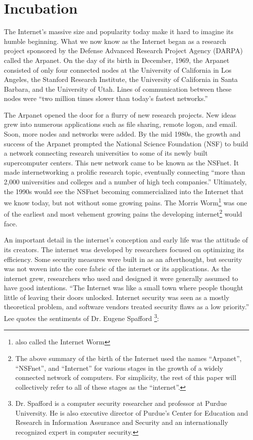 \section*{Incubation}
\setcounter{page}{1}

The Internet's massive size and popularity today make it hard to imagine its
humble beginning. What we now know as the Internet began as a research project
sponsored by the Defense Advanced Research Project Agency (DARPA) called the
Arpanet. On the day of its birth in December, 1969, the Arpanet consisted of
only four connected nodes at the University of California in Los Angeles, the
Stanford Research Institute, the University of California in Santa Barbara, and
the University of Utah.
Lines of communication between these nodes were ``two million times slower than
today's fastest networks.''\cite{strawn_masterminds_2014} 

The Arpanet opened the door for a flurry of new research projects. New ideas
grew into numerous applications such as file sharing, remote logon, and email.
Soon, more nodes and networks were added. By the mid 1980s, the growth and success
of the Arpanet prompted the National Science Foundation (NSF) to build a network
connecting research universities to some of its newly built supercomputer
centers.
This new network came to be known as the NSFnet.
It made internetworking a prolific research topic,
eventually connecting ``more than 2,000 universities and colleges and a
number of high tech companies.''\cite{strawn_masterminds_2014} Ultimately, the
1990s would see the NSFnet becoming commercialized into the Internet that we
know today, but not without some growing pains. The Morris
Worm\footnote{also called the Internet Worm} was one of the earliest and most
vehement growing pains the developing internet\footnote {
The above summary of the
birth of the Internet used the names ``Arpanet'', ``NSFnet'', and ``Internet''
for various stages in the growth of a widely connected network of computers. For
simplicity, the rest of this paper will collectively refer to all of these
stages as the ``internet''.
} 
would face.

An important detail in the internet's conception and early life was the
attitude of its creators.
The internet was developed by researchers focused on
optimizing its efficiency. Some security
measures were built in as an afterthought, but security was not woven into
the core fabric of the internet or its applications. As the internet
grew, researchers who used and designed
it were generally assumed to have good intentions. ``The Internet was
like a small town where people thought little of leaving their doors unlocked. Internet security was
seen as a mostly theoretical problem, and software vendors treated security
flaws as a low priority.''\cite{lee_washpost_2013} Lee\cite{lee_washpost_2013}
quotes the sentiments of Dr.
Eugene Spafford \footnote{
Dr. Spafford is a computer security researcher and professor at Purdue
University. He is also executive director of Purdue's Center for Education
and Research in Information Assurance and Security and an internationally
recognized expert in computer security.}:

